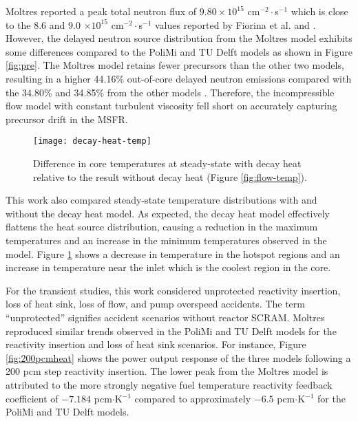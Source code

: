 Moltres reported a peak total neutron flux of $9.80 \times 10^{15}$
cm$^{-2}\cdot$s$^{-1}$ which is close to the 8.6 and 9.0 $\times 10^{15}$
cm$^{-2}\cdot$s$^{-1}$ values reported by Fiorina et al.
\cite{fiorina_molten_2013} and \cite{aufiero_development_2014}. However, the
delayed neutron source distribution from the Moltres model exhibits some
differences compared to the PoliMi and TU Delft models as shown in Figure
\ref{fig:pre}. The Moltres model retains fewer precursors than the other two
models, resulting in a higher 44.16\% out-of-core delayed neutron emissions
compared with the 34.80\% and 34.85\% from the other models
\cite{park_advancement_2020}. Therefore, the incompressible flow model with
constant turbulent viscosity fell short on accurately capturing precursor
drift in the \gls{MSFR}.

\begin{figure}[htb]
    \centering
    \texttt{[image: decay-heat-temp]}
    \caption{Difference in core temperatures at steady-state with decay heat
    relative to the result without decay heat (Figure \ref{fig:flow-temp}).}
    \label{fig:decayheattemp}
\end{figure}

This work also compared steady-state temperature distributions with and without
the decay heat model. As expected, the decay heat model effectively flattens
the heat source distribution, causing a reduction in the maximum
temperatures and an increase in the minimum temperatures observed in the model.
Figure \ref{fig:decayheattemp} shows a decrease in temperature in the hotspot
regions and an increase in temperature near the inlet which is the coolest
region in the core.

For the transient studies, this work considered unprotected reactivity
insertion, loss of heat sink, loss of flow, and pump overspeed accidents. The
term ``unprotected'' signifies accident scenarios without reactor SCRAM.
Moltres reproduced similar trends observed in the PoliMi and TU Delft
models for the reactivity insertion and loss of heat sink scenarios. For
instance, Figure \ref{fig:200pcmheat} shows the power output response of the
three models following a 200 pcm step reactivity insertion. The lower peak from
the Moltres model is attributed to the more strongly negative fuel temperature
reactivity feedback coefficient of $-7.184$ pcm$\cdot$K$^{-1}$ compared to
approximately $-6.5$ pcm$\cdot$K$^{-1}$ for the PoliMi and TU Delft models.

